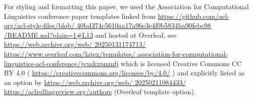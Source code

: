 \documentclass[11pt]{article}
\begin{document}
For styling and formatting this paper, we used the Association for Computational Linguistics conference paper templates linked from 
\href{https://github.com/acl-org/acl-style-files/blob/40bd374c5610aa17a96e3e4f0b5834ba90febe98/README.md?plain=1#L13}{https://github.com/acl-org/acl-style-files/blob/
40bd374c5610aa17a96e3e4f0b5834ba90febe98
/README.md?plain=1\#L13} and hosted at Overleaf, see \href{https://web.archive.org/web/20250131174713/https://www.overleaf.com/latex/templates/association-for-computational-linguistics-acl-conference/jvxskxpnznfj}{https://web.archive.org/web/
20250131174713/
https://www.overleaf.com/latex/templates/
association-for-computational-linguistics-acl-conference/jvxskxpnznfj} which is licensed Creative Commons CC BY 4.0 ( \href{https://creativecommons.org/licenses/by/4.0/}{https://creativecommons.org/licenses/by/4.0/} ) and explicitly listed as an option by \href{https://web.archive.org/web/20250211084433/https://aclrollingreview.org/authors}{https://web.archive.org/web/
20250211084433/
https://aclrollingreview.org/authors} (Overleaf template option).
\end{document}
